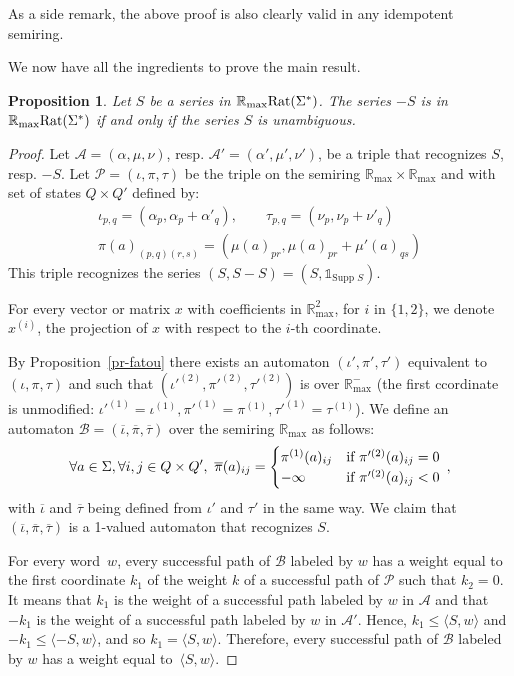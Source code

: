 \documentclass{article}
\newtheorem{prpstn}[thrm]{Proposition}
\newcommand{\mrm}[1]{\text{\rm #1}}
\newcommand{\supp}[1]{\text{Supp }#1}
\def\cA{{\mathcal A}}
\def\cB{{\mathcal B}}
\def\cP{{\mathcal P}}
\newcommand{\R} {\ensuremath{\mathbb{R}}}
\newcommand{\Rmax} {\R_{\max}}
\newcommand{\1}{\mathbb{1}}
\newcommand{\0}{\mathbb{0}}
\newcommand{\coef}[2]{\langle #1, #2\rangle}
\def\ab{\Sigma}
\begin{document}
As a side remark, the above proof is also clearly valid in any idempotent semiring. 

\medskip

We now have all the ingredients to prove the main result. 

\begin{prpstn}
\label{pr-maxmin2}
Let $S$  be a series in $\Rmax\mrm{Rat}(\ab^*)$. The series $-S$ is in
$\Rmax\mrm{Rat}(\ab^*)$ if and only if the series $S$ is unambiguous. 
\end{prpstn}

\begin{proof}
Let $\cA=(\alpha,\mu,\nu)$, resp. $\cA'=(\alpha',\mu',\nu')$, be a triple
that recognizes $S$, resp. $-S$.
Let  $\cP=(\iota,\pi,\tau)$ be the triple on the semiring $\Rmax \times
\Rmax$ and with set of states $Q\times Q'$ defined by:
\begin{gather*}
\iota_{p,q}=(\alpha_p,\alpha_p+\alpha'_q),\qquad
\tau_{p,q}=(\nu_p,\nu_p+\nu'_q)\\
\pi(a)_{(p,q)(r,s)}=(\mu(a)_{pr},\mu(a)_{pr}+\mu'(a)_{qs})
\end{gather*}
This triple recognizes the series $(S,S-S)=(S, \1_{\supp{S}})$.

For every vector or matrix $x$ with coefficients in $\Rmax^2$,
for $i$ in $\{1,2\}$, we denote $x^{(i)}$, the projection of $x$ with
respect to the $i$-th coordinate.

By Proposition~\ref{pr-fatou} there exists an
automaton $(\iota',\pi',\tau')$ 
equivalent to $(\iota,\pi,\tau)$ and such that
$(\iota'^{(2)},\pi'^{(2)},\tau'^{(2)})$ is over $\Rmax^{-}$ (the first
ccordinate is unmodified: $\iota'^{(1)}= \iota^{(1)}, \pi'^{(1)}=
\pi^{(1)}, \tau'^{(1)} =\tau^{(1)}$).
We define an automaton
$\cB=(\overline{\iota},\overline{\pi},\overline{\tau})$ over the semiring
$\Rmax$ as follows:
\[
\forall a\in \ab, \forall i, j \in Q\times Q', \ \overline{\pi}(a)_{ij}= 
\begin{cases}
\pi^{(1)}(a)_{ij} & \mrm{if } \pi'^{(2)}(a)_{ij}= 0 \\
-\infty & \mrm{if } \pi'^{(2)}(a)_{ij} < 0 
\end{cases}\:,
\]
with $\overline{\iota}$ and $\overline{\tau}$ being defined from
$\iota'$ and $\tau'$ in the same way. 
We claim that $(\overline{\iota},\overline{\pi},\overline{\tau})$ is a
1-valued automaton that recognizes $S$. 

For every word~$w$, every successful path of
$\cB$ labeled by $w$ has a weight equal to the first coordinate $k_1$
of the weight $k$ of a successful path of $\cP$ such that $k_2=0$.
It means that $k_1$ is the weight of a successful path labeled by $w$ in $\cA$
and that $-k_1$ is the weight of a successful path labeled by $w$ in $\cA'$.
Hence, $k_1\leq\coef{S}{w}$ and $-k_1\leq\coef{-S}{w}$,
and so $k_1=\coef{S}{w}$.
Therefore, every successful path of $\cB$
labeled by $w$ has a weight equal to~$\coef{S}{w}$.


\end{proof}
\end{document}
